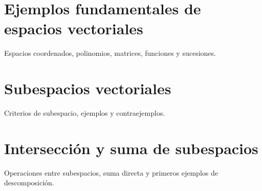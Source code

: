 \section{Ejemplos fundamentales de espacios vectoriales}
Espacios coordenados, polinomios, matrices, funciones y sucesiones.

\section{Subespacios vectoriales}
Criterios de subespacio, ejemplos y contraejemplos.

\section{Intersección y suma de subespacios}
Operaciones entre subespacios, suma directa y primeros ejemplos de descomposición.
